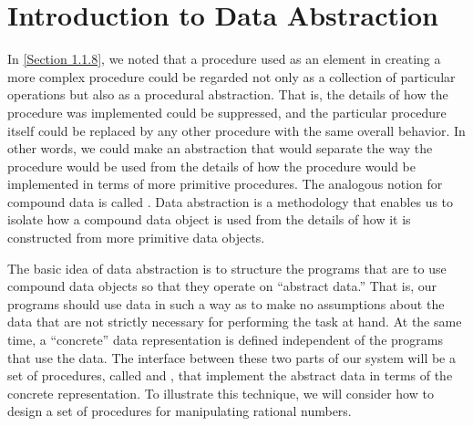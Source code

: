 \section{Introduction to Data Abstraction}
\label{Section 2.1}

In \cref{Section 1.1.8}, we noted that a procedure used as an element in creating a more complex procedure could be regarded not only as a collection of particular operations but also as a procedural abstraction.
That is, the details of how the procedure was implemented could be suppressed, and the particular procedure itself could be replaced by any other procedure with the same overall behavior.
In other words, we could make an abstraction that would separate the way the procedure would be used from the details of how the procedure would be implemented in terms of more primitive procedures.
The analogous notion for compound data is called .
Data abstraction is a methodology that enables us to isolate how a compound data object is used from the details of how it is constructed from more primitive data objects.

The basic idea of data abstraction is to structure the programs that are to use compound data objects so that they operate on “abstract data.”
That is, our programs should use data in such a way as to make no assumptions about the data that are not strictly necessary for performing the task at hand.
At the same time, a “concrete” data representation is defined independent of the programs that use the data.
The interface between these two parts of our system will be a set of procedures, called  and , that implement the abstract data in terms of the concrete representation.
To illustrate this technique, we will consider how to design a set of procedures for manipulating rational numbers.





